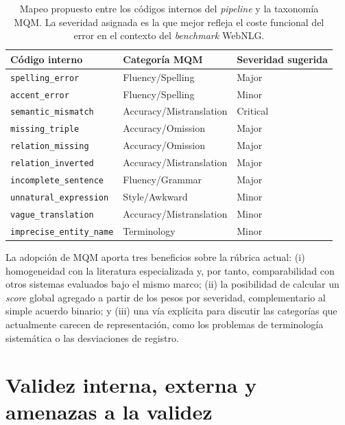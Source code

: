 \begin{table}[ht]
	\centering
	\small
	\begin{tabular}{lll}
		\hline
		\textbf{Código interno}          & \textbf{Categoría MQM}  & \textbf{Severidad sugerida} \\
		\hline
		\texttt{spelling\_error}         & Fluency/Spelling        & Major                       \\
		\texttt{accent\_error}           & Fluency/Spelling        & Minor                       \\
		\texttt{semantic\_mismatch}      & Accuracy/Mistranslation & Critical                    \\
		\texttt{missing\_triple}         & Accuracy/Omission       & Major                       \\
		\texttt{relation\_missing}       & Accuracy/Omission       & Major                       \\
		\texttt{relation\_inverted}      & Accuracy/Mistranslation & Major                       \\
		\texttt{incomplete\_sentence}    & Fluency/Grammar         & Major                       \\
		\texttt{unnatural\_expression}   & Style/Awkward           & Minor                       \\
		\texttt{vague\_translation}      & Accuracy/Mistranslation & Minor                       \\
		\texttt{imprecise\_entity\_name} & Terminology             & Minor                       \\
		\hline
	\end{tabular}
	\caption{Mapeo propuesto entre los códigos internos del \textit{pipeline}
		y la taxonomía MQM. La severidad asignada es la que mejor refleja el coste
		funcional del error en el contexto del \textit{benchmark} WebNLG.}
	\label{tab:mqm-mapeo}
\end{table}

La adopción de MQM aporta tres beneficios sobre la rúbrica actual: (i)
homogeneidad con la literatura especializada y, por tanto, comparabilidad con
otros sistemas evaluados bajo el mismo marco; (ii) la posibilidad de calcular
un \textit{score} global agregado a partir de los pesos por severidad,
complementario al simple acuerdo binario; y (iii) una vía explícita para
discutir las categorías que actualmente carecen de representación, como los
problemas de terminología sistemática o las desviaciones de registro.

\section{Validez interna, externa y amenazas a la validez}
\label{sec:amenazas-validez}


